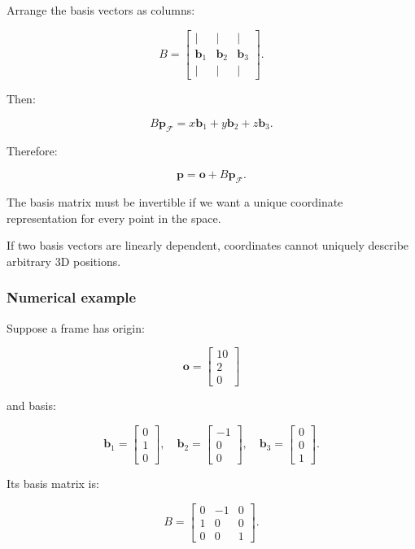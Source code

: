 Arrange the basis vectors as columns:

\[
 B= \begin{bmatrix} |&|&|\\ \mathbf b_1&\mathbf b_2&\mathbf b_3\\ |&|&| \end{bmatrix}.
\]

Then:

\[
 B\mathbf p_{\mathcal F} = x\mathbf b_1+y\mathbf b_2+z\mathbf b_3.
\]

Therefore:

\[
 \boxed{ \mathbf p=\mathbf o+B\mathbf p_{\mathcal F} }.
\]

The basis matrix must be invertible if we want a unique coordinate representation for every point in the space.

If two basis vectors are linearly dependent, coordinates cannot uniquely describe arbitrary 3D positions.

\subsubsection{Numerical example}\label{02-foundations-ii-ch032-numerical-example}

Suppose a frame has origin:

\[
 \mathbf o= \begin{bmatrix}10\\2\\0\end{bmatrix}
\]

and basis:

\[
 \mathbf b_1= \begin{bmatrix}0\\1\\0\end{bmatrix},\quad \mathbf b_2= \begin{bmatrix}-1\\0\\0\end{bmatrix},\quad \mathbf b_3= \begin{bmatrix}0\\0\\1\end{bmatrix}.
\]

Its basis matrix is:

\[
 B= \begin{bmatrix} 0&-1&0\\ 1&0&0\\ 0&0&1 \end{bmatrix}.
\]

